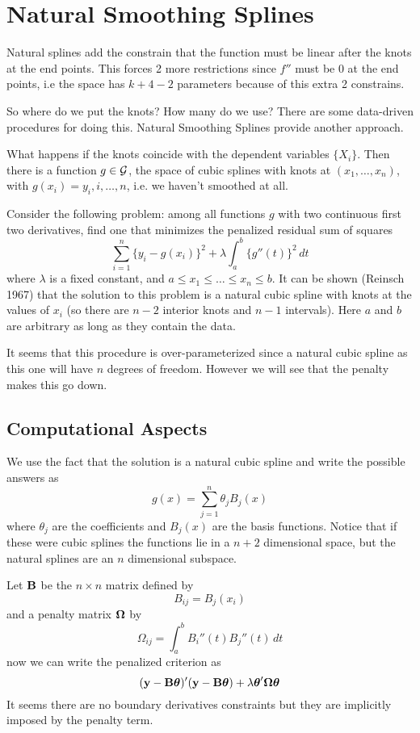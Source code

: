 \section{Natural Smoothing Splines}
Natural splines add the constrain that the function must be linear after
the knots at the end points. This forces 2 more restrictions since
$f''$ must be 0 at the end points, i.e the space has $k + 4 - 2$
parameters because of 
this extra 2 constrains. 

So where do we put the knots? How many do we use? There are some
data-driven procedures for doing this. Natural Smoothing Splines
provide another approach.

What happens if the knots coincide with the dependent variables
$\{X_i\}$. Then there is a function $g \in \cal G$, the space of cubic
splines with knots at $(x_1,\dots,x_n)$, with
$g(x_i) = y_i, i,\dots,n$, i.e. we haven't smoothed at all.

Consider the following problem: among all functions 
$g$ with two  continuous first two derivatives, find one that minimizes
the penalized residual sum of squares
\[
\sum_{i=1}^n \{ y_i - g(x_i) \}^2 + \lambda \int_a^b \{g''(t)\}^2 \,
dt
\]
where $\lambda$ is a fixed constant, and $a \leq x_1 \leq \dots \leq
x_n \leq b$. It can be shown (Reinsch 1967) that the solution to this
problem is a 
natural cubic spline with knots at the values of $x_i$ (so there are
$n-2$ interior knots and $n-1$ intervals). Here $a$ and
$b$ are arbitrary as long as they contain the data.

It seems that this procedure is over-parameterized since a
natural cubic spline as this one will have $n$ degrees of
freedom. However we will see that the penalty makes this go down.

\subsection{Computational Aspects}
We use the fact that the solution is a natural cubic spline and write
the possible answers as
\[
g(x) = \sum_{j=1}^{n} \theta_j B_j(x)
\]
where $\theta_j$ are the coefficients and $B_j(x)$ are the basis
functions. Notice that if these were cubic splines the functions lie
in a $n+2$ dimensional space, but the natural splines are an $n$
dimensional subspace. 

Let ${\mathbf B}$ be the $n \times n$ matrix defined by
\[
B_{ij} = B_j(x_i)
\]
and a penalty matrix $\mbox{\boldmath $\Omega$\unboldmath}$ by
\[
\Omega_{ij} = \int_a^b B_i''(t)B_j''(t) \, dt
\]
now we can write the penalized criterion as
\[
({\mathbf y} - {\mathbf B}\mbox{\boldmath $\theta$\unboldmath})'({\mathbf y} - {\mathbf B}\mbox{\boldmath $\theta$\unboldmath}) +
\lambda\mbox{\boldmath $\theta$\unboldmath}'\mbox{\boldmath $\Omega$\unboldmath}\mbox{\boldmath $\theta$\unboldmath}
\]
It seems there are no boundary derivatives constraints but they are
implicitly imposed by the penalty term.


